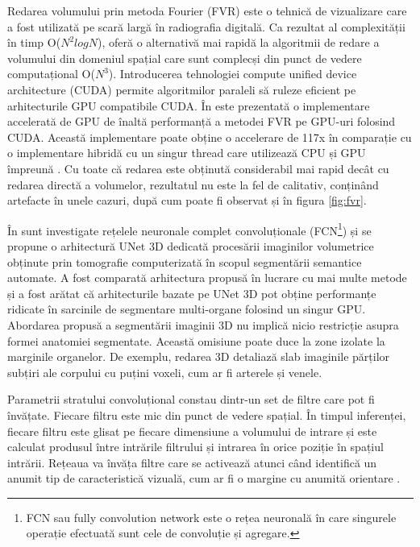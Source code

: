 Redarea volumului prin metoda Fourier (FVR) este o tehnică de vizualizare care a fost utilizată pe scară largă în radiografia digitală. Ca rezultat al complexității în timp O($N^2 log N$), oferă o alternativă mai rapidă la algoritmii de redare a volumului din domeniul spațial care sunt complecși din punct de vedere computațional O($N^3$). Introducerea tehnologiei compute unified device architecture (CUDA) permite algoritmilor paraleli să ruleze eficient pe arhitecturile GPU compatibile CUDA. În  \cite{abdellah2015} este prezentată o implementare accelerată de GPU de înaltă performanță a metodei FVR pe GPU-uri folosind CUDA. Această implementare poate obține o accelerare de 117x în comparație cu o implementare hibridă cu un singur thread care utilizează CPU și GPU împreună \cite{abdellah2015}. Cu toate că redarea este obținută considerabil mai rapid decât cu redarea directă a volumelor, rezultatul nu este la fel de calitativ, conținând artefacte în unele cazuri, după cum poate fi observat și în figura \ref{fig:fvr}.

În \cite{radiuk2020} sunt investigate rețelele neuronale complet convoluționale (FCN\footnote{FCN sau fully convolution network este o rețea neuronală în care singurele operație efectuată sunt cele de convoluție și agregare.}) și se propune o arhitectură UNet 3D dedicată procesării imaginilor volumetrice obținute prin tomografie computerizată în scopul segmentării semantice automate. A fost comparată arhitectura propusă în lucrare cu mai multe metode și a fost arătat că arhitecturile bazate pe UNet 3D pot obține performanțe ridicate în sarcinile de segmentare multi-organe folosind un singur GPU. Abordarea propusă a segmentării imaginii 3D nu implică nicio restricție asupra formei anatomiei segmentate. Această omisiune poate duce la zone izolate la marginile organelor. De exemplu, redarea 3D detaliază slab imaginile părților subțiri ale corpului cu puțini voxeli, cum ar fi arterele și venele.

Parametrii stratului convoluțional constau dintr-un set de filtre care pot fi învățate. Fiecare filtru este mic din punct de vedere spațial. În timpul inferenței, fiecare filtru este glisat pe fiecare dimensiune a volumului de intrare și este calculat produsul între intrările filtrului și intrarea în orice poziție în spațiul intrării. Rețeaua va învăța filtre care se activează atunci când identifică un anumit tip de caracteristică vizuală, cum ar fi o margine cu anumită orientare \cite{cs231n}.

